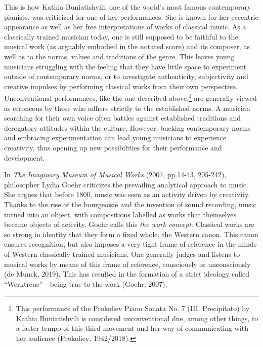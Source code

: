 \documentclass[authordate, empirical, issue]{jote-new-article}
\begin{document}
This is how Kathia Buniatishvili, one of the world's most famous contemporary pianists, was criticized for one of her performances. She is known for her eccentric appearance as well as her free interpretations of works of classical music. As a classically trained musician today, one is still supposed to be faithful to the musical work (as arguably embodied in the notated score) and its composer, as well as to the norms, values and traditions of the genre. This leaves young musicians struggling with the feeling that they have little space to experiment outside of contemporary norms, or to investigate authenticity, subjectivity and creative impulses by performing classical works from their own perspective. Unconventional performances, like the one described above,\footnote{ This performance of the Prokofiev Piano Sonata No. 7 (III. Precipitato) by Kathia Buniatishvili is considered unconventional due, among other things, to a faster tempo of this third movement and her way of communicating with her audience (Prokofiev, 1942/2018). } are generally viewed as erroneous by those who adhere strictly to the established norms. A musician searching for their own voice often battles against established traditions and derogatory attitudes within the culture. However, bucking contemporary norms and embracing experimentation can lead young musicians to experience creativity, thus opening up new possibilities for their performance and development.



In \emph{The Imaginary Museum of Musical Works }(2007, pp.14-43, 205-242), philosopher Lydia Goehr criticizes the prevailing analytical approach to music. She argues that before 1800, music was seen as an activity driven by creativity. Thanks to the rise of the bourgeoisie and the invention of sound recording, music turned into an object, with compositions labelled as works that themselves became objects of activity. Goehr calls this \emph{the work concept}. Classical works are so strong in identity that they form a fixed whole, the Western canon. This canon ensures recognition, but also imposes a very tight frame of reference in the minds of Western classically trained musicians. One generally judges and listens to musical works by means of this frame of reference, consciously or unconsciously (de Munck, 2019). This has resulted in the formation of a strict ideology called “Werktreue”—being true to the work (Goehr, 2007).
\end{document}
